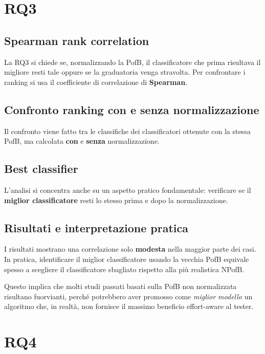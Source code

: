 \section{RQ3}

\subsection{Spearman rank correlation}

La RQ3 si chiede se, normalizzando la PofB, il classificatore che prima risultava il migliore resti tale oppure se la graduatoria venga stravolta. Per confrontare i ranking si usa il coefficiente di correlazione di \textbf{Spearman}.

\subsection{Confronto ranking con e senza normalizzazione}

Il confronto viene fatto tra le classifiche dei classificatori ottenute con la stessa PofB, ma calcolata \textbf{con} e \textbf{senza} normalizzazione.

\subsection{Best classifier}

L'analisi si concentra anche su un aspetto pratico fondamentale: verificare se il \textbf{miglior classificatore} resti lo stesso prima e dopo la normalizzazione.

\subsection{Risultati e interpretazione pratica}

I risultati mostrano una correlazione solo \textbf{modesta} nella maggior parte dei casi. In pratica, identificare il miglior classificatore usando la vecchia PofB equivale spesso a scegliere il classificatore sbagliato rispetto alla più realistica NPofB.

Questo implica che molti studi passati basati sulla PofB non normalizzata risultano fuorvianti, perché potrebbero aver promosso come \emph{miglior modello} un algoritmo che, in realtà, non fornisce il massimo beneficio effort-aware al tester.

\section{RQ4}

